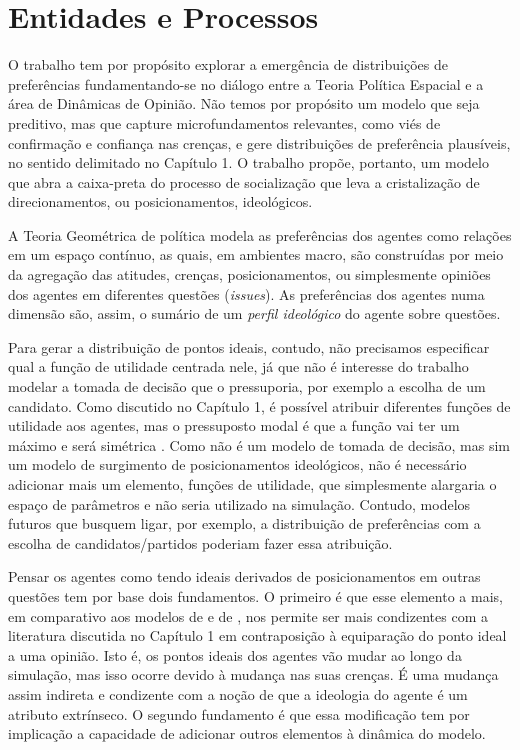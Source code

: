 \section{Entidades e Processos}

O trabalho tem por propósito explorar a emergência de distribuições de
preferências fundamentando-se no diálogo entre a Teoria Política Espacial e a
área de Dinâmicas de Opinião. Não temos por propósito um modelo que seja
preditivo, mas que capture microfundamentos relevantes, como viés de confirmação
e confiança nas crenças, e gere distribuições de preferência plausíveis, no
sentido delimitado no Capítulo 1. O trabalho propõe, portanto, um modelo que
abra a caixa-preta do processo de socialização que leva a cristalização de
direcionamentos, ou posicionamentos, ideológicos.

A Teoria Geométrica de política modela as preferências dos agentes como relações
em um espaço contínuo, as quais, em ambientes macro, são construídas por meio da
agregação das atitudes, crenças, posicionamentos, ou simplesmente opiniões dos
agentes em diferentes questões (\textit{issues}). As preferências dos agentes
numa dimensão são, assim, o sumário de um \textit{perfil ideológico} do agente
sobre questões.

Para gerar a distribuição de pontos ideais, contudo, não precisamos especificar
qual a função de utilidade centrada nele, já que não é interesse do trabalho
modelar a tomada de decisão que o pressuporia, por exemplo a escolha de um
candidato. Como discutido no Capítulo 1, é possível atribuir diferentes funções
de utilidade aos agentes, mas o pressuposto modal é que a função vai ter um
máximo e será simétrica \cite{eguia2013spatial, carroll2013structure}. Como não
é um modelo de tomada de decisão, mas sim um modelo de surgimento de
posicionamentos ideológicos, não é necessário adicionar mais um elemento,
funções de utilidade, que simplesmente alargaria o espaço de parâmetros e não
seria utilizado na simulação. Contudo, modelos futuros que busquem ligar, por
exemplo, a distribuição de preferências com a escolha de candidatos/partidos
poderiam fazer essa atribuição.


Pensar os agentes como tendo ideais derivados de posicionamentos em outras
questões tem por base dois fundamentos. O primeiro é que esse elemento a mais, em
comparativo aos modelos de  e de
, nos permite ser mais condizentes com a
literatura discutida no Capítulo 1 em contraposição à equiparação do ponto ideal
a uma opinião. Isto é, os pontos ideais dos agentes vão mudar ao longo da
simulação, mas isso ocorre devido à mudança nas suas crenças. É uma
mudança assim indireta e condizente com a noção de que a ideologia do agente é
um atributo extrínseco. O segundo fundamento é que essa modificação tem por
implicação a capacidade de adicionar outros elementos à dinâmica do modelo.

